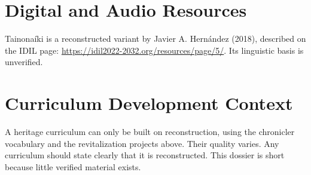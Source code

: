 \documentclass[12pt]{article}
\begin{document}
\section{Digital and Audio Resources}
Tainona\'iki is a reconstructed variant by Javier A. Hern\'andez (2018), described on the IDIL page: \url{https://idil2022-2032.org/resources/page/5/}. Its linguistic basis is unverified.

\section{Curriculum Development Context}
A heritage curriculum can only be built on reconstruction, using the chronicler vocabulary and the revitalization projects above. Their quality varies. Any curriculum should state clearly that it is reconstructed. This dossier is short because little verified material exists.
\end{document}
